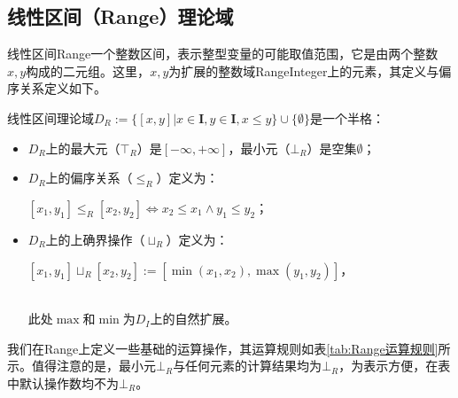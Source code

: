 \subsection{线性区间（Range）理论域}

线性区间Range一个整数区间，表示整型变量的可能取值范围，它是由两个整数$ x, y $构成的二元组。这里，$ x, y $为扩展的整数域RangeInteger上的元素，其定义与偏序关系定义如下。

\begin{definition}
	线性区间理论域$ D_R :=  \{ [x, y] | x \in \mathbf{I}, y \in \mathbf{I}, x \le y \} \cup \{ \emptyset \}$是一个半格：	
	\begin{itemize}
		\item $ D_R $上的最大元（$ \top_R $）是$ [-\infty, +\infty] $，最小元（$ \bot_R $）是空集$ \emptyset $；
		\item $ D_R $上的偏序关系（$ \le_R $）定义为：\\	
		\centerline{$ [x_1, y_1] \le_R [x_2, y_2] \iff x_2 \le x_1 \land y_1 \le y_2 $；}
		\item $ D_R $上的上确界操作（$ \sqcup_R $）定义为：\\	
		\centerline{$ [x_1, y_1] \sqcup_R [x_2, y_2] := [\min(x_1, x_2), \max(y_1, y_2)] $，}  \\
		此处$ \max $和$ \min $为$ D_I $上的自然扩展。
	\end{itemize}
\end{definition}

我们在Range上定义一些基础的运算操作，其运算规则如表\ref{tab:Range运算规则}所示。值得注意的是，最小元$ \bot_R $与任何元素的计算结果均为$ \bot_R $，为表示方便，在表中默认操作数均不为$ \bot_R $。

